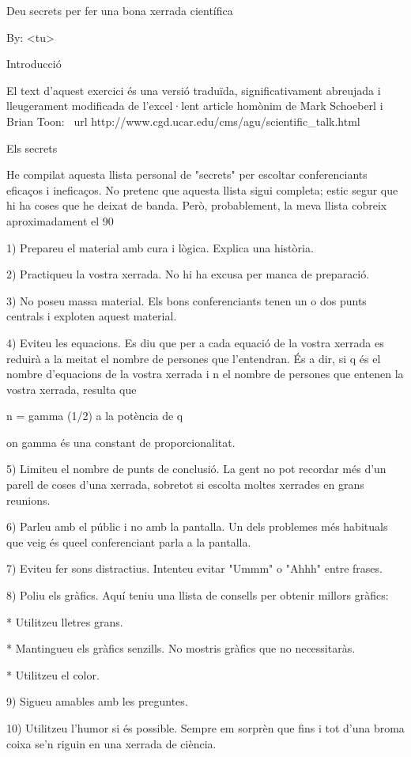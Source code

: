 \documentclass[12pt]{article}
\begin{document}
Deu secrets per fer una bona xerrada científica

By: <tu>

Introducció

El text d'aquest exercici és una versió traduïda, significativament abreujada i lleugerament modificada de l'excel·lent article homònim de Mark Schoeberl i Brian Toon:
\ url {http://www.cgd.ucar.edu/cms/agu/scientific_talk.html}

Els secrets

He compilat aquesta llista personal de "secrets" per escoltar conferenciants eficaços i ineficaços. No pretenc que aquesta llista sigui completa; estic segur que hi ha coses que he deixat de banda. Però, probablement, la meva llista cobreix aproximadament el 90%

1) Prepareu el material amb cura i lògica. Explica una història.

2) Practiqueu la vostra xerrada. No hi ha excusa per manca de preparació.

3) No poseu massa material. Els bons conferenciants tenen un o dos punts centrals i exploten aquest material.

4) Eviteu les equacions. Es diu que per a cada equació de la vostra xerrada es reduirà a la meitat el nombre de persones que l'entendran. És a dir, si q és el nombre d'equacions de la vostra xerrada i n el nombre de persones que entenen la vostra xerrada, resulta que

n = gamma (1/2) a la potència de q

on gamma és una constant de proporcionalitat.

5) Limiteu el nombre de punts de conclusió. La gent no pot recordar més d'un parell de coses d'una xerrada, sobretot si escolta moltes xerrades en grans reunions.

6) Parleu amb el públic i no amb la pantalla. Un dels problemes més habituals que veig és queel conferenciant parla a la pantalla.

7) Eviteu fer sons distractius. Intenteu evitar "Ummm" o "Ahhh" entre frases.

8) Poliu els gràfics. Aquí teniu una llista de consells per obtenir millors gràfics:

* Utilitzeu lletres grans.

* Mantingueu els gràfics senzills. No mostris gràfics que no necessitaràs.

* Utilitzeu el color.

9) Sigueu amables amb les preguntes.

10) Utilitzeu l'humor si és possible. Sempre em sorprèn que fins i tot d'una broma coixa se'n riguin en una xerrada de ciència.
\end{document}

